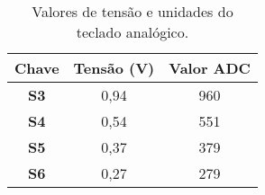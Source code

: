 \begin{table}[H]
    \centering
    \caption[Valores de tensão e unidades do teclado analógico]{Valores de tensão e unidades do teclado analógico.
    \label{tab:tecladoad}}
\begin{tabular}{|c|c|c|}
\hline
\textbf{Chave} & \textbf{Tensão (V)} & \textbf{Valor ADC} \\ \hline
\textbf{S3} & 0,94 & 960 \\ \hline
\textbf{S4} & 0,54 & 551 \\ \hline
\textbf{S5} & 0,37 & 379 \\ \hline
\textbf{S6} & 0,27 & 279 \\ \hline
\end{tabular}
\end{table}
